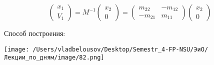 \documentclass[12pt, a4paper]{report}
\begin{document}
\[ \begin{pmatrix}
x_1 \\
V_1 
\end{pmatrix} = M^{-1 }
\begin{pmatrix}
    x_2 \\
    0 
\end{pmatrix} =
\begin{pmatrix}
m_{22} & -m_{12}\\
-m_{21} & m_{11}
\end{pmatrix}\begin{pmatrix}
    x_2\\
    0 
\end{pmatrix}\] 

Способ построения: 

\begin{center}
    \texttt{[image: /Users/vladbelousov/Desktop/Semestr\_4-FP-NSU/ЭиО/Лекции\_по\_дням/image/82.png]}
\end{center} 


\ifdefined\mainfile
\else
    
\end{document}
